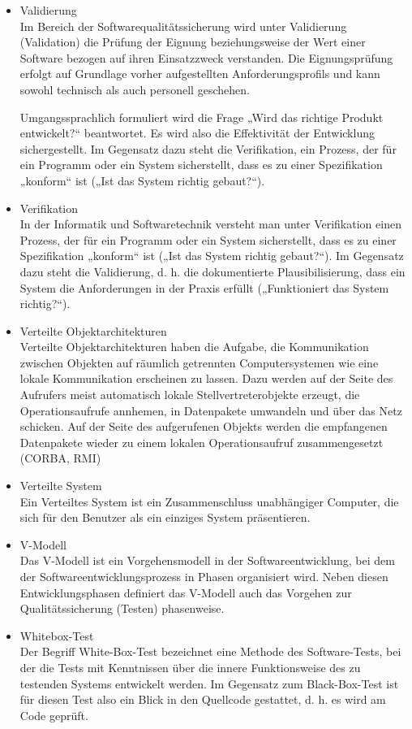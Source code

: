 \begin{itemize}
\item 	Validierung \\ Im Bereich der Softwarequalitätssicherung wird unter Validierung (Validation) die Prüfung der Eignung beziehungsweise der Wert einer Software bezogen auf ihren Einsatzzweck verstanden. Die Eignungsprüfung erfolgt auf Grundlage vorher aufgestellten Anforderungsprofils und kann sowohl technisch als auch personell geschehen.

Umgangssprachlich formuliert wird die Frage „Wird das richtige Produkt entwickelt?“ beantwortet. Es wird also die Effektivität der Entwicklung sichergestellt. Im Gegensatz dazu steht die Verifikation, ein Prozess, der für ein Programm oder ein System sicherstellt, dass es zu einer Spezifikation „konform“ ist („Ist das System richtig gebaut?“).
\item 	Verifikation \\ In der Informatik und Softwaretechnik versteht man unter Verifikation einen Prozess, der für ein Programm oder ein System sicherstellt, dass es zu einer Spezifikation „konform“ ist („Ist das System richtig gebaut?“). Im Gegensatz dazu steht die Validierung, d. h. die dokumentierte Plausibilisierung, dass ein System die Anforderungen in der Praxis erfüllt („Funktioniert das System richtig?“).
\item 	Verteilte Objektarchitekturen \\ Verteilte Objektarchitekturen haben die Aufgabe, die Kommunikation zwischen Objekten auf räumlich getrennten Computersystemen wie eine lokale Kommunikation erscheinen zu lassen. Dazu werden auf der Seite des Aufrufers meist automatisch lokale Stellvertreterobjekte erzeugt, die Operationsaufrufe annhemen, in Datenpakete umwandeln und über das Netz schicken. Auf der Seite des aufgerufenen Objekts werden die empfangenen Datenpakete wieder zu einem lokalen Operationsaufruf zusammengesetzt (CORBA, RMI)
\item 	Verteilte System \\ Ein Verteiltes System ist ein Zusammenschluss unabhängiger Computer, die sich für den Benutzer als ein einziges System präsentieren.
\item 	V-Modell \\ Das V-Modell ist ein Vorgehensmodell in der Softwareentwicklung, bei dem der Softwareentwicklungsprozess in Phasen organisiert wird. Neben diesen Entwicklungsphasen definiert das V-Modell auch das Vorgehen zur Qualitätssicherung (Testen) phasenweise.
\item 	Whitebox-Test \\ Der Begriff White-Box-Test bezeichnet eine Methode des Software-Tests, bei der die Tests mit Kenntnissen über die innere Funktionsweise des zu testenden Systems entwickelt werden. Im Gegensatz zum Black-Box-Test ist für diesen Test also ein Blick in den Quellcode gestattet, d. h. es wird am Code geprüft.

\end{itemize}
